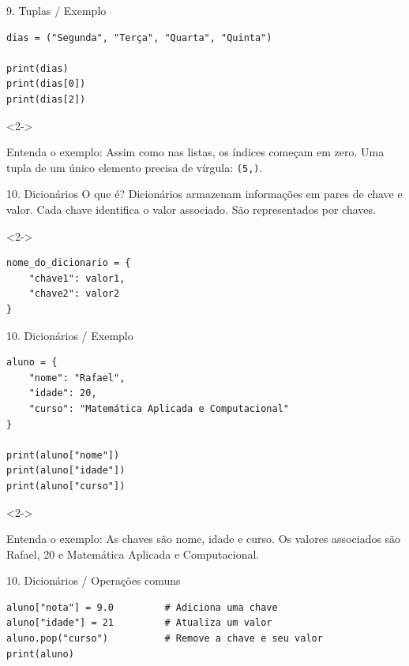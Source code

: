 \begin{frame}[fragile,t]{9. Tuplas / Exemplo}
\begin{lstlisting}
dias = ("Segunda", "Terça", "Quarta", "Quinta")

print(dias)
print(dias[0])
print(dias[2])
\end{lstlisting}
\begin{visibleenv}<2->
\begin{EMASCnote}
Entenda o exemplo: Assim como nas listas, os índices começam em zero. Uma tupla de um único elemento precisa de vírgula: \texttt{(5,)}.
\end{EMASCnote}
\end{visibleenv}
\end{frame}

\begin{frame}[fragile,t]{10. Dicionários}
O que é? Dicionários armazenam informações em pares de chave e valor. Cada chave identifica o valor associado. São representados por chaves.\par
\begin{visibleenv}<2->
\begin{lstlisting}
nome_do_dicionario = {
    "chave1": valor1,
    "chave2": valor2
}
\end{lstlisting}
\end{visibleenv}
\end{frame}

\begin{frame}[fragile,t]{10. Dicionários / Exemplo}
\begin{lstlisting}
aluno = {
    "nome": "Rafael",
    "idade": 20,
    "curso": "Matemática Aplicada e Computacional"
}

print(aluno["nome"])
print(aluno["idade"])
print(aluno["curso"])
\end{lstlisting}
\begin{visibleenv}<2->
\begin{EMASCnote}
Entenda o exemplo: As chaves são nome, idade e curso. Os valores associados são Rafael, 20 e Matemática Aplicada e Computacional.
\end{EMASCnote}
\end{visibleenv}
\end{frame}

\begin{frame}[fragile,t]{10. Dicionários / Operações comuns}
\begin{lstlisting}
aluno["nota"] = 9.0         # Adiciona uma chave
aluno["idade"] = 21         # Atualiza um valor
aluno.pop("curso")          # Remove a chave e seu valor
print(aluno)
\end{lstlisting}
\end{frame}

